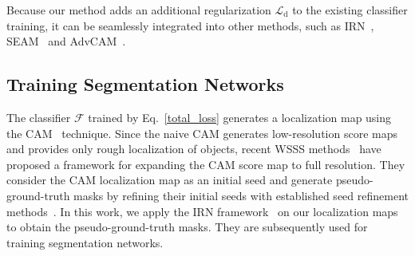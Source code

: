 \documentclass[10pt,twocolumn,letterpaper]{article}
\begin{document}
Because our method adds an additional regularization $\mathcal{L}_\text{d}$ to the existing classifier training, it can be seamlessly integrated into other methods, such as IRN~\cite{ahn2019weakly}, SEAM~\cite{wang2020self} and AdvCAM~\cite{lee2021anti}.




\subsection{Training Segmentation Networks}\label{method_trainseg}
The classifier $\mathcal{F}$ trained by Eq.~\ref{total_loss} generates a localization map using the CAM~\cite{zhou2016learning} technique.
Since the naive CAM generates low-resolution score maps and provides only rough localization of objects, recent WSSS methods~\cite{lee2019ficklenet, wang2020self, lee2021reducing, su2021context, lee2021anti, zhang2020causal} have proposed a framework for expanding the CAM score map to full resolution. They consider the CAM localization map as an initial seed and generate pseudo-ground-truth masks by refining their initial seeds with established seed refinement methods~\cite{huang2018weakly, ahn2018learning, ahn2019weakly, kolesnikov2016seed}. 
In this work, we apply the IRN framework~\cite{ahn2019weakly} on our localization maps to obtain the pseudo-ground-truth masks. They are subsequently used for training segmentation networks.
\end{document}
